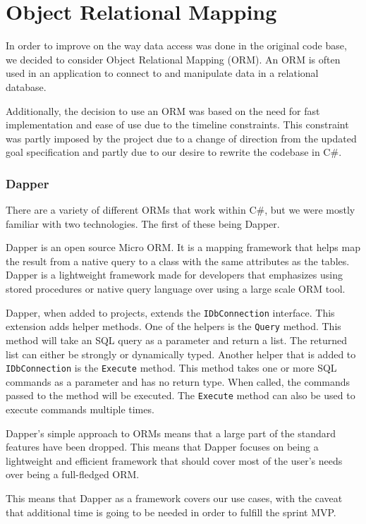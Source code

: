 \section{Object Relational Mapping}
In order to improve on the way data access was done in the original code base, we decided to consider Object Relational Mapping (ORM).
An ORM is often used in an application to connect to and manipulate data in a relational database\cite{ORM}. 

Additionally, the decision to use an ORM was based on the need for fast implementation and ease of use due to the timeline constraints. This constraint was partly imposed by the \knox{} project due to a change of direction from the updated goal specification and partly due to our desire to rewrite the codebase in C\#. 

\subsubsection{Dapper}
There are a variety of different ORMs that work within C\#, but we were mostly familiar with two technologies. The first of these being Dapper.
 
Dapper is an open source Micro ORM. It is a mapping framework that helps map the result from a native query to a class with the same attributes as the tables. Dapper is a lightweight framework made for developers that emphasizes using stored procedures or native query language over using a large scale ORM tool. 


Dapper, when added to projects, extends the \texttt{IDbConnection} interface. This extension adds helper methods. 
One of the helpers is the \texttt{Query} method. This method will take an SQL query as a parameter and return a list. The returned list can either be strongly or dynamically typed.
Another helper that is added to \texttt{IDbConnection} is the \texttt{Execute} method. This method takes one or more SQL commands as a parameter and has no return type. When called, the commands passed to the method will be executed. The \texttt{Execute} method can also be used to execute commands multiple times\cite{Dapper_Git}.

Dapper's simple approach to ORMs means that a large part of the standard features have been dropped. This means that Dapper focuses on being a lightweight and efficient framework that should cover most of the user's needs over being a full-fledged ORM\cite{Dapper_Git}.

This means that Dapper as a framework covers our use cases, with the caveat that additional time is going to be needed in order to fulfill the sprint MVP. 

